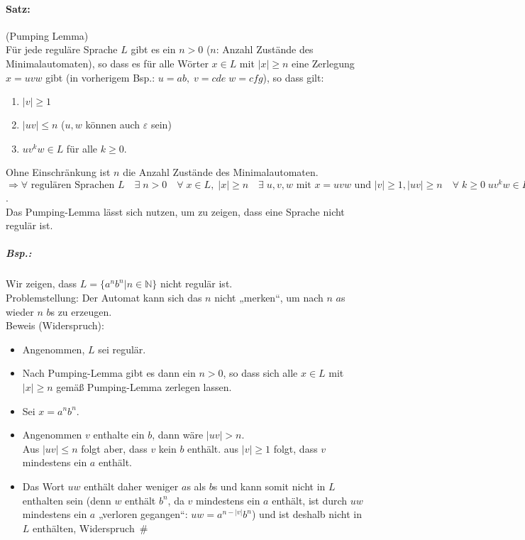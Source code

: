 \paragraph{Satz:} (Pumping Lemma)\\
Für jede reguläre Sprache $L$ gibt es ein $n>0$ ($n$: Anzahl Zustände des Minimalautomaten), so dass es für alle Wörter $x \in L$ mit $|x|\geq n$ eine Zerlegung $x=uvw$ gibt (in vorherigem Bsp.: $u=ab, \; v=cde \; w =cfg$), so dass gilt:
\begin{enumerate}
\item $|v| \geq 1$
\item $|uv|\leq n$ \quad ($u, w$ können auch $\varepsilon$ sein)
\item $uv^kw \in L$ für alle $k\geq 0$.
\end{enumerate}
Ohne Einschränkung ist $n$ die Anzahl Zustände des Minimalautomaten.\\
$\Rightarrow \forall \text{ regulären Sprachen }L\quad \exists \;n>0 \quad\forall \; x \in L, \; |x| \geq n \quad \exists \;u,v,w \text{ mit }x=uvw \text{ und }|v| \geq 1,|uv|\geq n \quad \forall \; k\geq 0 \; uv^kw\in L$.\\
Das Pumping-Lemma lässt sich nutzen, um zu zeigen, dass eine Sprache nicht regulär ist.
\subparagraph{Bsp.:} Wir zeigen, dass $L=\{a^nb^n|n\in \mathbb{N}\}$ nicht regulär ist.\\
Problemstellung: Der Automat kann sich das $n$ nicht „merken“, um nach $n$ $a$s wieder $n$ $b$s zu erzeugen. \\
Beweis (Widerspruch):
\begin{itemize}
\item Angenommen, $L$ sei regulär.
\item Nach Pumping-Lemma gibt es dann ein $n>0$, so dass sich alle $x\in L$ mit $|x|\geq n$ gemäß Pumping-Lemma zerlegen lassen.
\item Sei $x=a^nb^n$. 
\item Angenommen $v$ enthalte ein $b$, dann wäre $|uv| > n$. \\
Aus $|uv|\leq n$ folgt aber, dass $v$ kein $b$ enthält. aus $|v|\geq 1$ folgt, dass $v$ mindestens ein $a$ enthält.\\
\item Das Wort $uw$ enthält daher weniger $a$s als $b$s und kann somit nicht in $L$ enthalten sein (denn $w$ enthält $b^n$, da $v$ mindestens ein $a$ enthält, ist durch $uw$ mindestens ein $a$ „verloren gegangen“: $uw=a^{n-|v|}b^n$) und ist deshalb nicht in $L$ enthälten, Widerspruch\,\lightning \; \#
\end{itemize}
